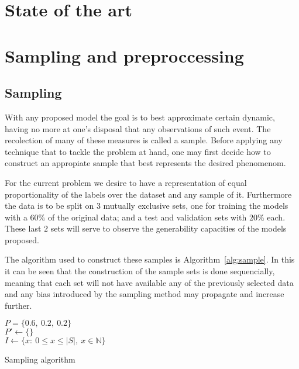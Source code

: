 \documentclass[journal]{IEEEtran}
\begin{document}
\section{State of the art\label{sec:state_of_art}}


\section{Sampling and preproccessing}
\subsection{Sampling\label{sec:sample}}

With any proposed model the goal is to best approximate certain dynamic, having
no more at one's disposal that any observations of such event. The recolection
of many of these measures is called a sample. Before applying any technique that
to tackle the problem at hand, one may first decide how to construct an
appropiate sample that best represents the desired phenomenom.

For the current problem we desire to have a representation of equal
proportionality of the labels over the dataset and any sample of it. Furthermore
the data is to be split on $3$ mutually exclusive sets, one for training the
models with a $60\%$ of the original data; and a test and validation sets with
$20\%$ each. These last $2$ sets will serve to observe the generability
capacities of the models proposed.

The algorithm used to construct these samples is Algorithm~\ref{alg:sample}. In
this it can be seen that the construction of the sample sets is done
sequencially, meaning that each set will not have available any of the
previously selected data and any bias introduced by the sampling method may
propagate and increase further.

\begin{algorithm}[ht]
    $P = \{0.6,\ 0.2,\ 0.2\}$\\
    $P' \gets \{\}$\\
    $I \gets \{x:\ 0\leq x\leq \lvert S\rvert,\ x\in\mathbb{N}\}$\\
     \caption{Sampling algorithm\label{alg:sample}}
\end{algorithm}
\end{document}
